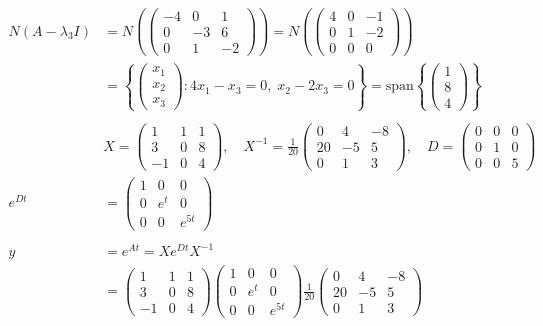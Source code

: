 \documentclass{article}
\begin{document}
\begin{align*}
    N(A - \lambda_3 I) &= N\left(\begin{pmatrix} -4 & 0 & 1 \\ 0 & -3 & 6 \\ 0 & 1 & -2 \end{pmatrix}\right) = N\left(\begin{pmatrix} 4 & 0 & -1 \\ 0 & 1 & -2 \\ 0 & 0 & 0 \end{pmatrix}\right) \\
    &= \left\{ \begin{pmatrix} x_1 \\ x_2 \\ x_3 \end{pmatrix} : 4x_1 - x_3 = 0, \; x_2 - 2x_3 = 0 \right\}
    = \text{span}\left\{ \begin{pmatrix} 1 \\ 8 \\ 4 \end{pmatrix} \right\} \\
    \\
    &X = \begin{pmatrix} 1 & 1 & 1 \\ 3 & 0 & 8 \\ -1 & 0 & 4 \end{pmatrix} , \quad
    X^{-1} = \frac{1}{20} \begin{pmatrix} 0 & 4 & -8 \\ 20 & -5 & 5 \\ 0 & 1 & 3 \end{pmatrix} , \quad
    D = \begin{pmatrix} 0 & 0 & 0 \\ 0 & 1 & 0 \\ 0 & 0 & 5 \end{pmatrix} \\
    e^{Dt} &= \begin{pmatrix} 1 & 0 & 0 \\ 0 & e^t & 0 \\ 0 & 0 & e^{5t} \end{pmatrix} \\
    \\
    y &= e^{At} = X e^{Dt} X^{-1} \\
    &= \begin{pmatrix} 1 & 1 & 1 \\ 3 & 0 & 8 \\ -1 & 0 & 4 \end{pmatrix} \begin{pmatrix} 1 & 0 & 0 \\ 0 & e^t & 0 \\ 0 & 0 & e^{5t} \end{pmatrix} \frac{1}{20} \begin{pmatrix} 0 & 4 & -8 \\ 20 & -5 & 5 \\ 0 & 1 & 3 \end{pmatrix} \\

\end{align*}
\end{document}
